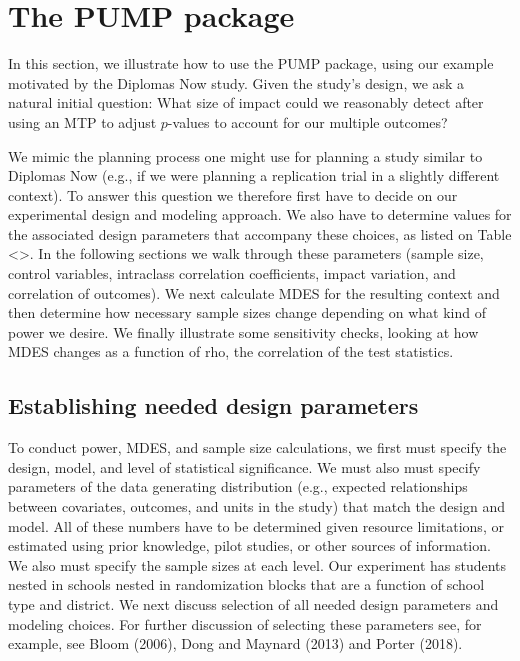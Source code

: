\documentclass[
]{article}
\begin{document}
\section{The PUMP package}

In this section, we illustrate how to use the PUMP package, using our
example motivated by the Diplomas Now study. Given the study's design,
we ask a natural initial question: What size of impact could we
reasonably detect after using an MTP to adjust \(p\)-values to account
for our multiple outcomes?

We mimic the planning process one might use for planning a study similar
to Diplomas Now (e.g., if we were planning a replication trial in a
slightly different context). To answer this question we therefore first
have to decide on our experimental design and modeling approach. We also
have to determine values for the associated design parameters that
accompany these choices, as listed on Table \textless{}\textgreater. In
the following sections we walk through these parameters (sample size,
control variables, intraclass correlation coefficients, impact
variation, and correlation of outcomes). We next calculate MDES for the
resulting context and then determine how necessary sample sizes change
depending on what kind of power we desire. We finally illustrate some
sensitivity checks, looking at how MDES changes as a function of rho,
the correlation of the test statistics.

\hypertarget{establishing-needed-design-parameters}{%
\subsection{Establishing needed design
parameters}\label{establishing-needed-design-parameters}}

To conduct power, MDES, and sample size calculations, we first must
specify the design, model, and level of statistical significance. We
must also must specify parameters of the data generating distribution
(e.g., expected relationships between covariates, outcomes, and units in
the study) that match the design and model. All of these numbers have to
be determined given resource limitations, or estimated using prior
knowledge, pilot studies, or other sources of information. We also must
specify the sample sizes at each level. Our experiment has students
nested in schools nested in randomization blocks that are a function of
school type and district. We next discuss selection of all needed design
parameters and modeling choices. For further discussion of selecting
these parameters see, for example, see Bloom (2006), Dong and Maynard
(2013) and Porter (2018).
\end{document}
